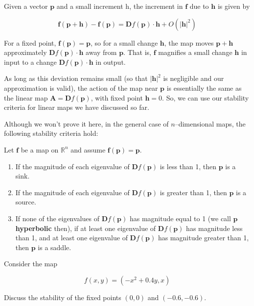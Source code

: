 Given a vector ${\mathbf p}$ and a small increment {\mathbf h}, the increment in ${\mathbf f}$ due to ${\mathbf h}$ is given by

\begin{equation}
{\mathbf f}({\mathbf p} + {\mathbf h}) - {\mathbf f}({\mathbf p}) = {\mathbf Df}({\mathbf p}) \cdot {\mathbf h} + O\left(|{\mathbf h}|^2\right)
\end{equation} 

For a fixed point, ${\mathbf f}({\mathbf p}) = {\mathbf p}$, so for a small change ${\mathbf h}$, the map moves ${\mathbf p} + {\mathbf h}$ approximately ${\mathbf Df}({\mathbf p}) \cdot {\mathbf h}$ away from ${\mathbf p}$. That is, ${\mathbf f}$ magnifies a small change ${\mathbf h}$ in input to a change ${\mathbf Df}({\mathbf p}) \cdot {\mathbf h}$ in output.

As long as this deviation remains small (so that $|{\mathbf h}|^2$ is negligible and our approximation is valid), the action of the map near ${\mathbf p}$ is essentially the same as the linear map ${\mathbf A} = {\mathbf Df}({\mathbf p})$, with fixed point ${\mathbf h} = 0$. So, we can use our stability criteria for linear maps we have discussed so far.

Although we won't prove it here, in the general case of $n$--dimensional maps, the following stability criteria hold:

Let ${\mathbf f}$ be a map on $\mathbb{R}^n$ and assume ${\mathbf f}({\mathbf p})={\mathbf p}$.

\begin{enumerate}
\item
If the magnitude of each eigenvalue of ${\mathbf Df}({\mathbf p})$ is less than 1, then ${\mathbf p}$ is a sink.
\item
If the magnitude of each eigenvalue of ${\mathbf Df}({\mathbf p})$ is greater than 1, then ${\mathbf p}$ is a source.
\item
If none of the eigenvalues of ${\mathbf Df}({\mathbf p})$ has magnitude equal to 1 (we call ${\mathbf p}$ \textbf{hyperbolic} then), if at least one eigenvalue of ${\mathbf Df}({\mathbf p})$ has magnitude less than 1, and at least one eigenvalue of ${\mathbf Df}({\mathbf p})$ has magnitude greater than 1, then ${\mathbf p}$ is a saddle.
\end{enumerate}


\begin{exer}
Consider the map 

$$f(x,y) = (-x^2+0.4y, x)$$

Discuss the stability of the fixed points $(0,0)$ and $(-0.6,-0.6)$.

\end{exer}

